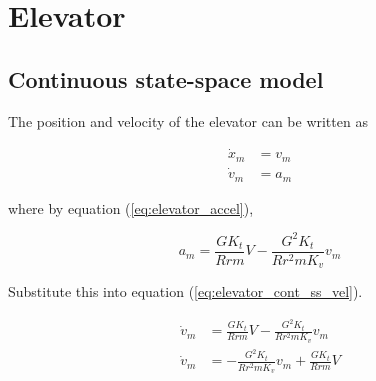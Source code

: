 \section{Elevator}

\subsection{Continuous state-space model}

The position and velocity of the elevator can be written as

\begin{align}
  \dot{x}_m &= v_m \label{eq:elevator_cont_ss_pos} \\
  \dot{v}_m &= a_m \label{eq:elevator_cont_ss_vel}
\end{align}

where by equation (\ref{eq:elevator_accel}),

\begin{equation*}
  a_m = \frac{GK_t}{Rrm} V - \frac{G^2 K_t}{Rr^2 m K_v} v_m
\end{equation*}

Substitute this into equation (\ref{eq:elevator_cont_ss_vel}).

\begin{align}
  \dot{v}_m &= \frac{GK_t}{Rrm} V - \frac{G^2 K_t}{Rr^2 m K_v} v_m \nonumber \\
  \dot{v}_m &= -\frac{G^2 K_t}{Rr^2 m K_v} v_m + \frac{GK_t}{Rrm} V
\end{align}

